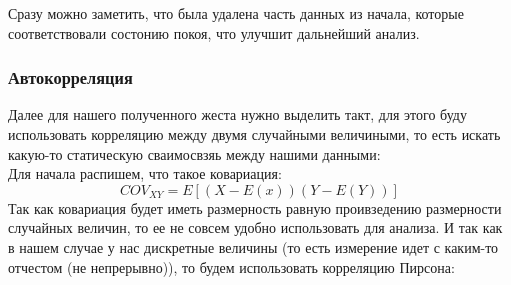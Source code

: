 \begin{figure}[H]
\end{figure}

Сразу можно заметить, что была удалена часть данных из начала, которые соответствовали состонию покоя, что улучшит дальнейший анализ.

\subsubsection{Автокорреляция}
Далее для нашего полученного жеста нужно выделить такт, для этого буду использовать корреляцию между двумя случайными величиными, то есть искать какую-то статическую сваимосвзяь между нашими данными: \\
Для начала распишем, что такое ковариация:
\[COV_{XY} = E\left[ (X - E(x)) (Y - E(Y))\right]\]
Так как ковариация будет иметь размерность равную проивзедению размерности случайных величин, то ее не совсем удобно использовать для анализа. И так как в нашем случае у нас дискретные величины (то есть измерение идет с каким-то отчестом (не непрерывно)), то будем использовать корреляцию Пирсона:

